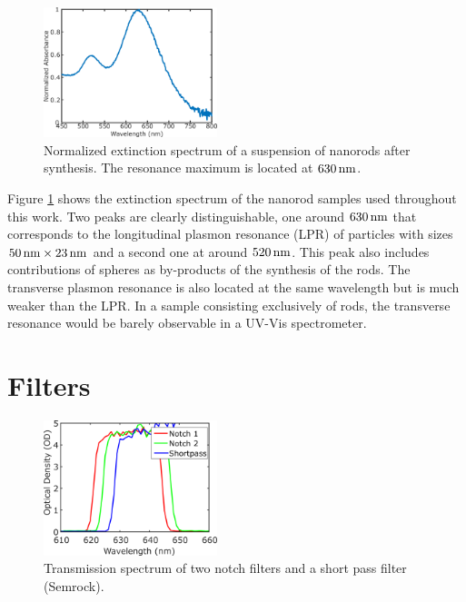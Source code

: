 \begin{figure}[htp]
 \centering
 \includegraphics[width=0.45\textwidth]{Chapters/03_Background_Free/Figures/Supplementary/02_UV-Vis/uvvis.png}
 \caption{Normalized extinction spectrum of a suspension of nanorods after
 synthesis. The resonance maximum is located at $630\,\textrm{nm}$.}
 \label{fig:uvvis}
 \end{figure}
 
 Figure \ref{fig:uvvis} shows the extinction spectrum of the nanorod samples
 used throughout this work. Two peaks are clearly distinguishable, one around
 $630\,\textrm{nm}$ that corresponds to the longitudinal plasmon resonance (LPR) of
 particles with sizes $50\,\textrm{nm}\times23\,\textrm{nm}$ and a second one at around $520\,\textrm{nm}$.
 This peak also includes contributions of spheres as by-products of the
 synthesis of the rods. The transverse plasmon resonance is also located at the
 same wavelength but is much weaker than the LPR. In a sample consisting exclusively of rods, the transverse resonance would be barely observable in a UV-Vis
 spectrometer.
 
 \newpage
 
\section{Filters}

\begin{figure}[htp]
 \centering
 \includegraphics[width=0.45\textwidth]{Chapters/03_Background_Free/Figures/Supplementary/03_Filters/filters.png}
 \caption{Transmission spectrum of two notch filters and a short pass
 filter (Semrock).}
 \label{fig:filters}
 \end{figure}
 
